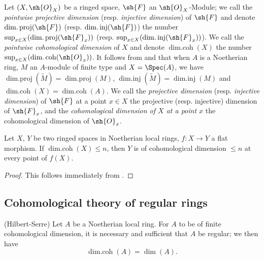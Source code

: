 \begin{env}[17.2.14]
\label{0.17.2.14}
Let $(X,\sh{O}_X)$ be a ringed space, $\sh{F}$ an $\sh{O}_X$-Module;
we call the \emph{pointwise projective dimension} (resp. \emph{injective dimension}) of $\sh{F}$ and denote $\operatorname{dim.proj}(\sh{F})$ (resp. $\operatorname{dim.inj}(\sh{F})$) the number $\sup_{x\in X}(\operatorname{dim.proj}(\sh{F}_x))$ (resp. $\sup_{x\in X}(\operatorname{dim.inj}(\sh{F}_x))$).
We call the \emph{pointwise cohomological dimension} of $X$ and denote $\operatorname{dim.coh}(X)$ the number $\sup_{x\in X}(\operatorname{dim.coh}(\sh{O}_x))$.
It follows from  and  that when $A$ is a Noetherian ring, $M$ an $A$-module of finite type and $X=\Spec(A)$, we have $\operatorname{dim.proj}(\widetilde{M})=\operatorname{dim.proj}(M)$, $\operatorname{dim.inj}(\widetilde{M})=\operatorname{dim.inj}(M)$ and $\operatorname{dim.coh}(X)=\operatorname{dim.coh}(A)$.
We call the \emph{projective dimension} (resp. \emph{injective dimension}) of $\sh{F}$ at a point $x\in X$ the projective (resp. injective) dimension of $\sh{F}_x$, and the \emph{cohomological dimension of $X$ at a point $x$} the cohomological dimension of $\sh{O}_x$.
\end{env}

\begin{proposition}[17.2.15]
\label{0.17.2.15}
Let $X$, $Y$ be two ringed spaces in Noetherian local rings, $f:X\to Y$ a flat morphism.
If $\operatorname{dim.coh}(X)\leq n$, then $Y$ is of cohomological dimension $\leq n$ at every point of $f(X)$.
\end{proposition}

\begin{proof}
This follows immediately from .
\end{proof}

\subsection{Cohomological theory of regular rings}
\label{subsection:0.17.3}

\begin{theorem}[17.3.1]
\label{0.17.3.1}
\textnormal{(Hilbert-Serre)}
Let $A$ be a Noetherian local ring.
For $A$ to be of finite cohomological dimension, it is necessary and sufficient that $A$ be regular; we then have
\[
\label{0.17.3.1.1}
  \operatorname{dim.coh}(A)=\dim(A).
  \tag{17.3.1.1}
\]
\end{theorem}

